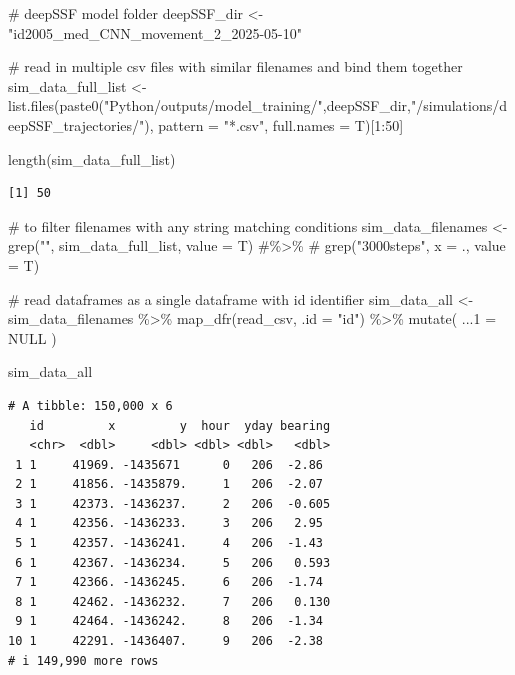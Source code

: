 \documentclass[
  letterpaper,
  DIV=11,
  numbers=noendperiod]{scrartcl}
\newenvironment{Shaded}{\begin{snugshade}}{\end{snugshade}}
\newcommand{\AttributeTok}[1]{\textcolor[rgb]{0.40,0.45,0.13}{#1}}
\newcommand{\CommentTok}[1]{\textcolor[rgb]{0.37,0.37,0.37}{#1}}
\newcommand{\ConstantTok}[1]{\textcolor[rgb]{0.56,0.35,0.01}{#1}}
\newcommand{\DecValTok}[1]{\textcolor[rgb]{0.68,0.00,0.00}{#1}}
\newcommand{\FunctionTok}[1]{\textcolor[rgb]{0.28,0.35,0.67}{#1}}
\newcommand{\NormalTok}[1]{\textcolor[rgb]{0.00,0.23,0.31}{#1}}
\newcommand{\OtherTok}[1]{\textcolor[rgb]{0.00,0.23,0.31}{#1}}
\newcommand{\SpecialCharTok}[1]{\textcolor[rgb]{0.37,0.37,0.37}{#1}}
\newcommand{\StringTok}[1]{\textcolor[rgb]{0.13,0.47,0.30}{#1}}
\begin{document}
\begin{Shaded}
\begin{Highlighting}[]
\CommentTok{\# deepSSF model folder}
\NormalTok{deepSSF\_dir }\OtherTok{\textless{}{-}} \StringTok{"id2005\_med\_CNN\_movement\_2\_2025{-}05{-}10"}

\CommentTok{\# read in multiple csv files with similar filenames and bind them together}
\NormalTok{sim\_data\_full\_list }\OtherTok{\textless{}{-}} 
  \FunctionTok{list.files}\NormalTok{(}\FunctionTok{paste0}\NormalTok{(}\StringTok{"Python/outputs/model\_training/"}\NormalTok{,deepSSF\_dir,}\StringTok{"/simulations/deepSSF\_trajectories/"}\NormalTok{), }\AttributeTok{pattern =} \StringTok{"*.csv"}\NormalTok{, }\AttributeTok{full.names =}\NormalTok{ T)[}\DecValTok{1}\SpecialCharTok{:}\DecValTok{50}\NormalTok{]}

\FunctionTok{length}\NormalTok{(sim\_data\_full\_list)}
\end{Highlighting}
\end{Shaded}

\begin{verbatim}
[1] 50
\end{verbatim}

\begin{Shaded}
\begin{Highlighting}[]
\CommentTok{\# to filter filenames with any string matching conditions}
\NormalTok{sim\_data\_filenames }\OtherTok{\textless{}{-}} \FunctionTok{grep}\NormalTok{(}\StringTok{""}\NormalTok{, sim\_data\_full\_list, }\AttributeTok{value =}\NormalTok{ T) }\CommentTok{\#\%\textgreater{}\% }
  \CommentTok{\# grep("3000steps", x = ., value = T) }

\CommentTok{\# read dataframes as a single dataframe with id identifier}
\NormalTok{sim\_data\_all }\OtherTok{\textless{}{-}}\NormalTok{ sim\_data\_filenames }\SpecialCharTok{\%\textgreater{}\%}
  \FunctionTok{map\_dfr}\NormalTok{(read\_csv, }\AttributeTok{.id =} \StringTok{"id"}\NormalTok{) }\SpecialCharTok{\%\textgreater{}\%} 
  \FunctionTok{mutate}\NormalTok{(}
    \AttributeTok{...1 =} \ConstantTok{NULL}
\NormalTok{    )}

\NormalTok{sim\_data\_all}
\end{Highlighting}
\end{Shaded}

\begin{verbatim}
# A tibble: 150,000 x 6
   id         x         y  hour  yday bearing
   <chr>  <dbl>     <dbl> <dbl> <dbl>   <dbl>
 1 1     41969. -1435671      0   206  -2.86 
 2 1     41856. -1435879.     1   206  -2.07 
 3 1     42373. -1436237.     2   206  -0.605
 4 1     42356. -1436233.     3   206   2.95 
 5 1     42357. -1436241.     4   206  -1.43 
 6 1     42367. -1436234.     5   206   0.593
 7 1     42366. -1436245.     6   206  -1.74 
 8 1     42462. -1436232.     7   206   0.130
 9 1     42464. -1436242.     8   206  -1.34 
10 1     42291. -1436407.     9   206  -2.38 
# i 149,990 more rows
\end{verbatim}
\end{document}
